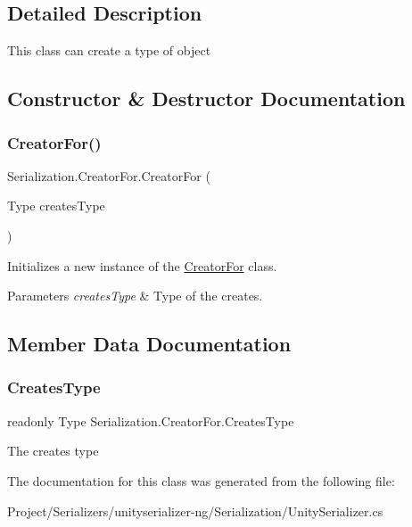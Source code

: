 \subsection{Detailed Description}
This class can create a type of object 



\subsection{Constructor \& Destructor Documentation}
\mbox{\label{class_serialization_1_1_creator_for_a4a5f1680ebe72dea8f522087ad4d2db3}} 
\subsubsection{\texorpdfstring{Creator\+For()}{CreatorFor()}}
{\footnotesize\ttfamily Serialization.\+Creator\+For.\+Creator\+For (\begin{DoxyParamCaption}\item[{Type}]{creates\+Type }\end{DoxyParamCaption})\hspace{0.3cm}{\ttfamily [inline]}}



Initializes a new instance of the \hyperlink{class_serialization_1_1_creator_for}{Creator\+For} class. 


\begin{DoxyParams}{Parameters}
{\em creates\+Type} & Type of the creates.\\
\hline
\end{DoxyParams}


\subsection{Member Data Documentation}
\mbox{\label{class_serialization_1_1_creator_for_a8c10d6db1b5eeb68cdce9ab14307142f}} 
\subsubsection{\texorpdfstring{Creates\+Type}{CreatesType}}
{\footnotesize\ttfamily readonly Type Serialization.\+Creator\+For.\+Creates\+Type}



The creates type 



The documentation for this class was generated from the following file\+:\begin{DoxyCompactItemize}
\item 
Project/\+Serializers/unityserializer-\/ng/\+Serialization/Unity\+Serializer.\+cs\end{DoxyCompactItemize}
